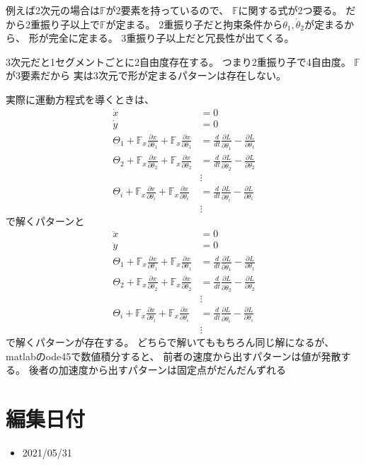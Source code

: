 \documentclass[a4paper,11pt]{jsarticle}
\begin{document}
例えば2次元の場合は$\mathbb{F}$が2要素を持っているので、
$\mathbb{F}$に関する式が2つ要る。
だから2重振り子以上で$\mathbb{F}$が定まる。
2重振り子だと拘束条件から$\dot{\theta}_1, \dot{\theta}_2$が定まるから、
形が完全に定まる。
3重振り子以上だと冗長性が出てくる。

3次元だと1セグメントごとに2自由度存在する。
つまり2重振り子で4自由度。
$\mathbb{F}$が3要素だから
実は3次元で形が定まるパターンは存在しない。

実際に運動方程式を導くときは、
\begin{align*}
  \dot{x} &= 0 \\
  \dot{y} &= 0 \\
  \Theta_1 + \mathbb{F}_x \frac{\partial x}{\partial \theta_1} + \mathbb{F}_x \frac{\partial x}{\partial \theta_1}
  & = \frac{d}{dt}\frac{\partial L}{\partial \dot{\theta}_1} - \frac{\partial L}{\partial \theta_1}
  \\ \Theta_2 + \mathbb{F}_x \frac{\partial x}{\partial \theta_2} + \mathbb{F}_x \frac{\partial x}{\partial \theta_2}
  & = \frac{d}{dt}\frac{\partial L}{\partial \dot{\theta}_2} - \frac{\partial L}{\partial \theta_2}
  \\ & \vdots
  \\ \Theta_i + \mathbb{F}_x \frac{\partial x}{\partial \theta_i} + \mathbb{F}_x \frac{\partial x}{\partial \theta_i}
  & = \frac{d}{dt}\frac{\partial L}{\partial \dot{\theta}_i} - \frac{\partial L}{\partial \theta_i}
  \\ & \vdots
\end{align*}
で解くパターンと
\begin{align*}
  \ddot{x} &= 0 \\
  \ddot{y} &= 0 \\
  \Theta_1 + \mathbb{F}_x \frac{\partial x}{\partial \theta_1} + \mathbb{F}_x \frac{\partial x}{\partial \theta_1}
  & = \frac{d}{dt}\frac{\partial L}{\partial \dot{\theta}_1} - \frac{\partial L}{\partial \theta_1}
  \\ \Theta_2 + \mathbb{F}_x \frac{\partial x}{\partial \theta_2} + \mathbb{F}_x \frac{\partial x}{\partial \theta_2}
  & = \frac{d}{dt}\frac{\partial L}{\partial \dot{\theta}_2} - \frac{\partial L}{\partial \theta_2}
  \\ & \vdots
  \\ \Theta_i + \mathbb{F}_x \frac{\partial x}{\partial \theta_i} + \mathbb{F}_x \frac{\partial x}{\partial \theta_i}
  & = \frac{d}{dt}\frac{\partial L}{\partial \dot{\theta}_i} - \frac{\partial L}{\partial \theta_i}
  \\ & \vdots
\end{align*}
で解くパターンが存在する。
どちらで解いてももちろん同じ解になるが、
matlabのode45で数値積分すると、
前者の速度から出すパターンは値が発散する。
後者の加速度から出すパターンは固定点がだんだんずれる


\section{編集日付}
\begin{itemize}
  \item 2021/05/31
\end{itemize}
\end{document}
